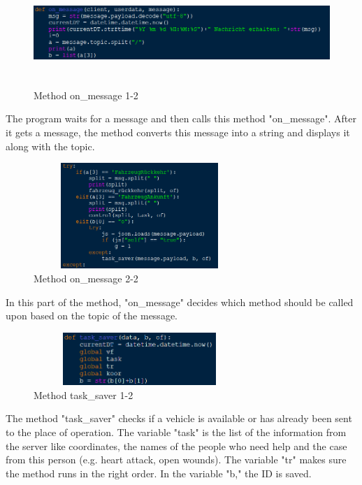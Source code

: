 \documentclass{article}
\begin{document}
\begin{figure}[htp]
    \centering
\includegraphics[width=14cm, height=4cm]{images/Ostrzinski/I5}
   \caption{Method on\_message 1-2}
    \label{fig:GALAXY}
\end{figure}
\newline
\newline
The program waits for a message and then calls this method "on\_message".
\newline
After it gets a message, the method converts this message into a string and displays it along with the topic. 

\clearpage
\begin{figure}[htp]
    \centering
\includegraphics[width=8cm, height=4cm]{images/Ostrzinski/I6}
   \caption{Method on\_message 2-2}
    \label{fig:GALAXY}
\end{figure}
\newline
\newline
In this part of the method, "on\_message" decides which method should be called upon based on the topic of the message.
\newline
\begin{figure}[htp]
    \centering
\includegraphics[width=8cm, height=2cm]{images/Ostrzinski/I7}
   \caption{Method task\_saver 1-2}
    \label{fig:GALAXY}
\end{figure}
\newline
\newline
The method "task\_saver" checks if a vehicle is available or has already been sent to the place of operation.
\newline
The variable "task" is the list of the information from the server like coordinates, the names of the people who need help and the case from this person (e.g. heart attack, open wounds).
\newline
The variable "tr" makes sure the method runs in the right order.
In the variable "b," the ID is saved.
\end{document}
